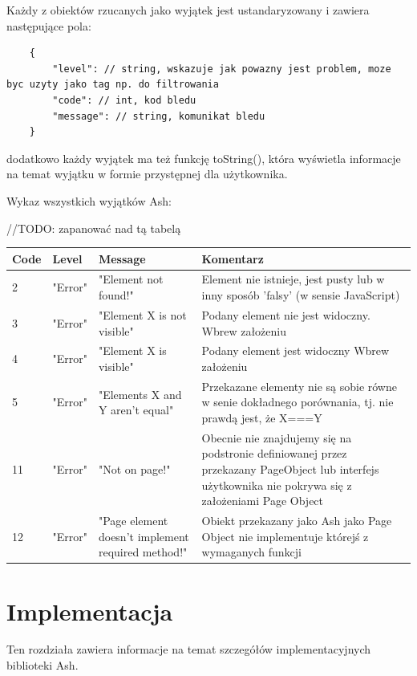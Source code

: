 \documentclass[brudnopis]{xmgr}
\begin{document}
Każdy z obiektów rzucanych jako wyjątek jest ustandaryzowany i zawiera następujące pola: 

\begin{lstlisting}
	{
		"level": // string, wskazuje jak powazny jest problem, moze byc uzyty jako tag np. do filtrowania 
		"code": // int, kod bledu
		"message": // string, komunikat bledu 
	}
\end{lstlisting}

dodatkowo każdy wyjątek ma też funkcję toString(), która wyświetla informacje na temat wyjątku w formie przystępnej dla użytkownika.

Wykaz wszystkich wyjątków Ash:

//TODO: zapanować nad tą tabelą
\begin{center}
    \begin{tabular}{ | p{1cm} | p{2cm} | p{4cm} | l |}
    \hline
    Code & Level & Message & Komentarz \\ \hline
    2 & "Error" & "Element not found!" & Element nie istnieje, jest pusty lub w inny sposób 'falsy' (w sensie JavaScript)  \\ \hline
    3 & "Error" & "Element X is not visible" & Podany element nie jest widoczny. Wbrew założeniu  \\ \hline
    4 & "Error" & "Element X is visible" & Podany element jest widoczny Wbrew założeniu  \\ \hline
    5 & "Error" & "Elements X and Y aren't equal" & Przekazane elementy nie są sobie równe w senie dokładnego porównania, tj.  nie prawdą jest, że X===Y  \\ \hline
    11 & "Error" & "Not on page!" & Obecnie nie znajdujemy się na podstronie definiowanej przez przekazany PageObject lub interfejs użytkownika nie pokrywa się z założeniami Page Object  \\ \hline
    12 & "Error" & "Page element doesn't implement required method!" & Obiekt przekazany jako Ash jako Page Object nie implementuje którejś z wymaganych funkcji  \\ \hline
    \end{tabular}
\end{center}

\chapter{Implementacja}

Ten rozdziała zawiera informacje na temat szczegółów implementacyjnych biblioteki Ash.
\end{document}

